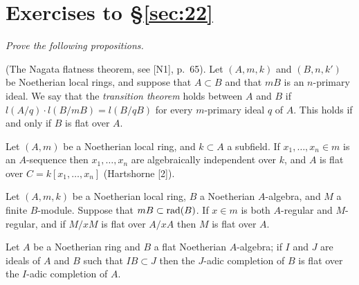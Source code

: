 \section*{Exercises to \S\ref{sec:22}}
\emph{Prove the following propositions.}

\begin{exercise}\label{ex:22.1-ex}
(The Nagata flatness theorem, see [N1], p.~65). Let $(A, m, k)$ and $(B, n, k')$
be Noetherian local rings, and suppose that $A \subset B$ and that $mB$ is an
$n$-primary ideal. We say that the \emph{transition theorem} holds between $A$ and
$B$ if $l(A/q) \cdot l(B/mB) = l(B/qB)$ for every $m$-primary ideal $q$ of $A$. This
holds if and only if $B$ is flat over $A$.
\end{exercise}

\begin{exercise}\label{ex:22.2-ex}
Let $(A, m)$ be a Noetherian local ring, and $k \subset A$ a subfield. If
$x_1, \ldots, x_n \in m$ is an $A$-sequence then $x_1, \ldots, x_n$ are algebraically
independent over $k$, and $A$ is flat over $C = k[x_1, \ldots, x_n]$
(Hartshorne [2]).
\end{exercise}

\begin{exercise}\label{ex:22.3-ex}
Let $(A, m, k)$ be a Noetherian local ring, $B$ a Noetherian $A$-algebra, and $M$
a finite $B$-module. Suppose that $mB \subset \operatorname{rad}(B)$. If $x \in m$ is both
$A$-regular and $M$-regular, and if $M/xM$ is flat over $A/xA$ then $M$ is flat
over $A$.
\end{exercise}

\begin{exercise}\label{ex:22.4-ex}
Let $A$ be a Noetherian ring and $B$ a flat Noetherian $A$-algebra; if $I$ and $J$
are ideals of $A$ and $B$ such that $IB \subset J$ then the $J$-adic completion of
$B$ is flat over the $I$-adic completion of $A$.
\end{exercise}
